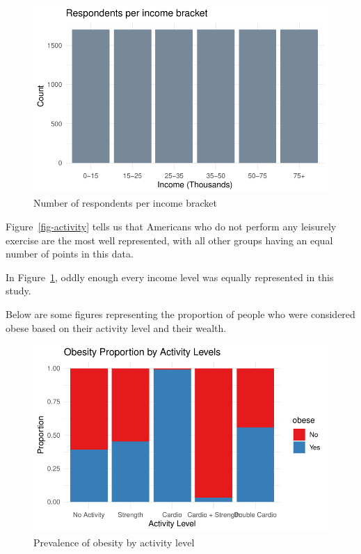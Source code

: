 \documentclass[
  letterpaper,
  DIV=11,
  numbers=noendperiod]{scrartcl}
\begin{document}
\begin{figure}

{\centering \includegraphics[width=\textwidth,height=0.2\textheight]{paper_files/figure-pdf/fig-income-1.pdf}

}

\caption{\label{fig-income}Number of respondents per income bracket}

\end{figure}

Figure~\ref{fig-activity} tells us that Americans who do not perform any
leisurely exercise are the most well represented, with all other groups
having an equal number of points in this data.

In Figure~\ref{fig-income}, oddly enough every income level was equally
represented in this study.

Below are some figures representing the proportion of people who were
considered obese based on their activity level and their wealth.

\begin{figure}

{\centering \includegraphics[width=\textwidth,height=0.2\textheight]{paper_files/figure-pdf/fig-activityobesity-1.pdf}

}

\caption{\label{fig-activityobesity}Prevalence of obesity by activity
level}

\end{figure}
\end{document}
